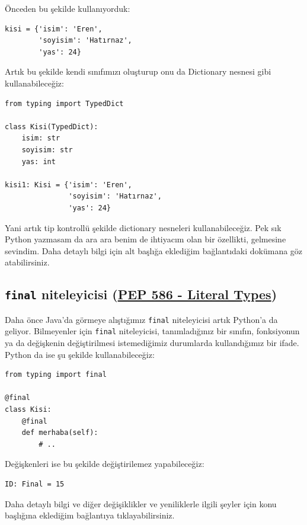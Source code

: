 \documentclass[11pt]{article}
\begin{document}
Önceden bu şekilde kullanıyorduk:
\begin{verbatim}
kisi = {'isim': 'Eren',
        'soyisim': 'Hatırnaz',
        'yas': 24}
\end{verbatim}

Artık bu şekilde kendi sınıfımızı oluşturup onu da Dictionary nesnesi gibi
kullanabileceğiz:
\begin{verbatim}
from typing import TypedDict

class Kisi(TypedDict):
    isim: str
    soyisim: str
    yas: int

kisi1: Kisi = {'isim': 'Eren',
               'soyisim': 'Hatırnaz',
               'yas': 24}
\end{verbatim}
Yani artık tip kontrollü şekilde dictionary nesneleri kullanabileceğiz. Pek
sık Python yazmasam da ara ara benim de ihtiyacım olan bir özellikti,
gelmesine sevindim. Daha detaylı bilgi için alt başlığa eklediğim bağlantıdaki
dokümana göz atabilirsiniz.
\subsection{\texttt{final} niteleyicisi (\href{https://www.python.org/dev/peps/pep-0586/}{PEP 586 - Literal Types})}
\label{sec:orgcab0113}
Daha önce Java'da görmeye alıştığımız \texttt{final} niteleyicisi artık Python'a da
geliyor. Bilmeyenler için \texttt{final} niteleyicisi, tanımladığınız bir sınıfın,
fonksiyonun ya da değişkenin değiştirilmesi istemediğimiz durumlarda
kullandığımız bir ifade. Python da ise şu şekilde kullanabileceğiz:
\begin{verbatim}
from typing import final

@final
class Kisi:
    @final
    def merhaba(self):
        # ..
\end{verbatim}
Değişkenleri ise bu şekilde değiştirilemez yapabileceğiz:
\begin{verbatim}
ID: Final = 15
\end{verbatim}

Daha detaylı bilgi ve diğer değişiklikler ve yeniliklerle ilgili şeyler için
konu başlığına eklediğim bağlantıya tıklayabilirsiniz.
\end{document}
